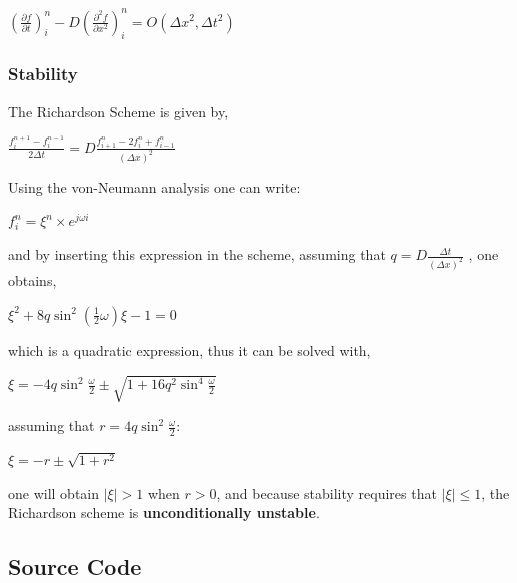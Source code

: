 \documentclass[12pt]{article}
\begin{document}
\begin{center}
\Large
$
\left( \frac{\partial f}{\partial t} \right)_i^n - D \left( \frac{\partial ^2 f}{\partial x ^2} \right)_i^n = O(\Delta x ^2, \Delta t ^2)
$
\end{center}
\subsubsection*{Stability}

\par The Richardson Scheme is given by,

\begin{center}
\Large
$
\frac{f_i^{n + 1} - f_i^{n - 1}}{2 \Delta t} = D \frac{f_{i + 1}^{n} - 2f_{i}^{n} + f_{i - 1}^{n}}{(\Delta x)^2}
$
\end{center}

\par Using the von-Neumann analysis one can write:

\begin{center}
\large
$ 
f_i^{n} = \xi^n \times e^{j \omega i}
$
\end{center}

\par and by inserting this expression in the scheme, assuming that $ q = D \frac{\Delta t}{(\Delta x)^2}$ , one obtains, 

\begin{center}
\large
$ 
	\xi ^2 + 8 q \sin ^2( \frac{1}{2} \omega) \xi - 1 = 0
$
\end{center}

which is a quadratic expression, thus it can be solved with,

\begin{center}
\large
$ 
	\xi = -4 q \sin ^2 \frac{\omega}{2} \pm \sqrt{1 + 16 q ^2 \sin ^4 \frac{\omega}{2}}
$
\end{center}

assuming that $r = 4 q \sin ^2 \frac{\omega}{2} $:

\begin{center}
\large
$ 
	\xi = -r \pm \sqrt{1 + r ^2}
$
\end{center}

one will obtain $\lvert \xi \lvert > 1$  when $r > 0$, and because stability requires that $\lvert \xi \lvert \le 1 $, the Richardson scheme is \textbf{unconditionally unstable}.

\newpage

\subsection*{Source Code}
\end{document}
